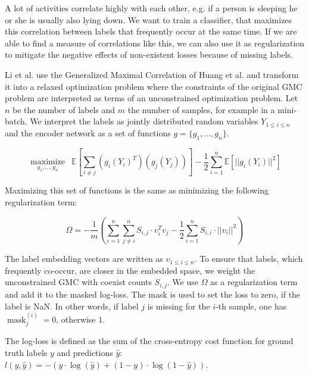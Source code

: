 A lot of activities correlate highly with each other, e.g. if a person is sleeping he or she is usually also lying down. We want to train a classifier, that maximizes this correlation between labels that frequently occur at the same time. If we are able to find a measure of correlations like this, we can also use it as regularization to mitigate the negative effects of non-existent losses because of missing labels.

Li et al. use the Generalized Maximal Correlation of Huang et al. \cite[Definition 2]{Huang2017} and transform it into a relaxed optimization problem where the constraints of the original GMC problem are interpreted as terms of an unconstrained optimization problem. Let $n$ be the number of labels and $m$ the number of samples, for example in a mini-batch. We interpret the labels as jointly distributed random variables $Y_{1\leq i \leq n}$ and the encoder network as a set of functions $g = \{g_1, \dots, g_n\}$.

\begin{equation}
	\underset{g_1, \dots, g_n}{\operatorname{maximize}} \hspace{6pt} \mathbb{E}\left[\sum_{i\neq j} 
	(g_i(Y_i)^T)(g_j(Y_j)) \right] - \frac{1}{2} \sum_{i=1}^{n} \mathbb{E}[||g_i(Y_i)||^2]
\end{equation}

Maximizing this set of functions is the same as minimizing the following regularization term:

\begin{equation}
	\Omega = - \frac{1}{m} \left(\sum_{i=1}^{n} \sum_{j \neq i}^{n} S_{i,j}\cdot v_i^T v_j - \frac{1}{2} \sum_{i=1}^{n} S_{i,i}\cdot ||v_i||^2 \right)
\end{equation}

The label embedding vectors are written as $v_{1\leq i \leq n}$. To ensure that labels, which frequently co-occur, are closer in the embedded space, we weight the unconstrained GMC with coexist counts $S_{i,j}$. We use $\Omega$ as a regularization term and add it to the masked log-loss. The mask is used to set the loss to zero, if the label is NaN. In other words, if label $j$ is missing for the $i$-th sample, one has $\operatorname{mask}_j^{(i)} = 0$, otherwise $1$.

The log-loss is defined as the sum of the cross-entropy cost function for ground truth labels $y$ and predictions $\hat{y}$: $l(y, \hat{y}) = -(y \cdot \log(\hat{y}) + (1 - y) \cdot \log(1 - \hat{y}))$.

